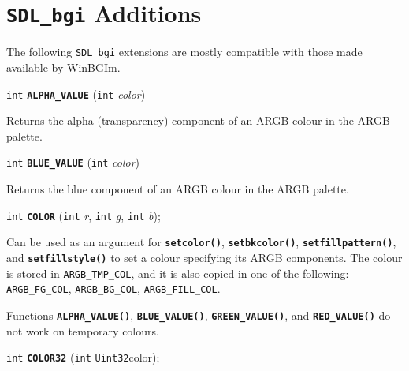 \documentclass[a4paper,12pt]{article}
\newcommand{\SDLbgi}{\texttt{SDL\_bgi}}
\newcommand{\I}{\texttt{int}}       %
\newcommand{\Ut}{\texttt{Uint32}}   %
\newcommand{\func}[1]{\textbf{\texttt{#1}}}  %
\newcommand{\A}[1]{\emph{#1}}       %
\newcommand{\T}[1]{\texttt{#1}}     %
\newenvironment{bgi}
{ %
  \begin{snugshade}
}
{ %
  \end{snugshade}
}
\begin{document}


\section{\SDLbgi{} Additions}

The following \SDLbgi{} extensions are mostly compatible with those
made available by WinBGIm.


\label{sec:ALPHAVALUE}

\begin{bgi}
\I{} \func{ALPHA\_VALUE} (\I{} \A{color})
\end{bgi}

Returns the alpha (transparency) component of an ARGB colour in the
ARGB palette.


\label{sec:BLUEVALUE}

\begin{bgi}
\I{} \func{BLUE\_VALUE} (\I{} \A{color})
\end{bgi}

Returns the blue component of an ARGB colour in the ARGB palette.


\label{sec:COLOR}

\begin{bgi}
\I{} \func{COLOR} (\I{} \A{r}, \I{} \A{g}, \I{} \A{b});
\end{bgi}

Can be used as an argument for \func{setcolor()}, \func{setbkcolor()},
\func{setfillpattern()}, and \func{setfillstyle()} to set a colour
specifying its ARGB components. The colour is stored in
\T{ARGB\_TMP\_COL}, and it is also copied in one of the following:
\T{ARGB\_FG\_COL}, \T{ARGB\_BG\_COL}, \T{ARGB\_FILL\_COL}.

Functions \func{ALPHA\_VALUE()}, \func{BLUE\_VALUE()},
\func{GREEN\_VALUE()}, and \func{RED\_VALUE()} do not work on temporary
colours.


\label{sec:COLOR32}

\begin{bgi}
\I{} \func{COLOR32} (\I{} \Ut{color});
\end{bgi}
\end{document}

